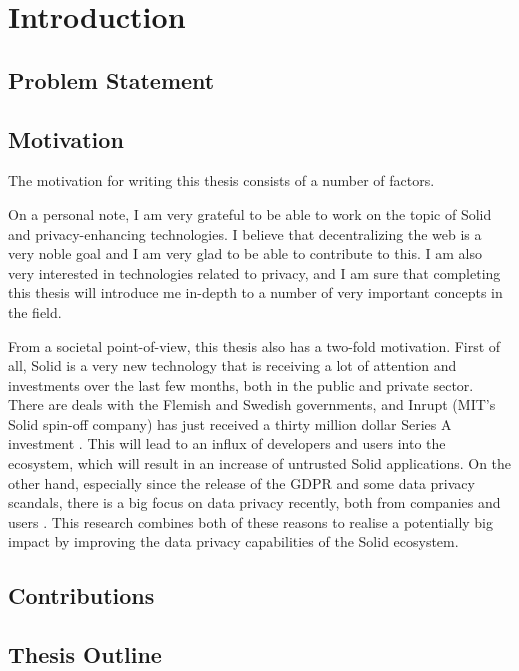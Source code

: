 \chapter{Introduction}
\label{cha:intro}

\section{Problem Statement}

\section{Motivation}
The motivation for writing this thesis consists of a number of factors. 

On a personal note, I am very grateful to be able to work on the topic of Solid and privacy-enhancing technologies. I believe that decentralizing the web is a very noble goal and I am very glad to be able to contribute to this. I am also very interested in technologies related to privacy, and I am sure that completing this thesis will introduce me in-depth to a number of very important concepts in the field.

From a societal point-of-view, this thesis also has a two-fold motivation. First of all, Solid is a very new technology that is receiving a lot of attention and investments over the last few months, both in the public and private sector. There are deals with the Flemish  and Swedish  governments, and Inrupt (MIT's Solid spin-off company) has just received a thirty million dollar Series A investment . This will lead to an influx of developers and users into the ecosystem, which will result in an increase of untrusted Solid applications. 
On the other hand, especially since the release of the GDPR and some data privacy scandals, there is a big focus on data privacy recently, both from companies and users . This research combines both of these reasons to realise a potentially big impact by improving the data privacy capabilities of the Solid ecosystem. 


\section{Contributions}

\section{Thesis Outline}